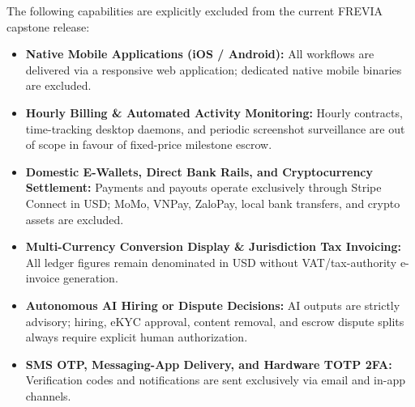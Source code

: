 The following capabilities are explicitly excluded from the current FREVIA capstone release:
\begin{itemize}[leftmargin=1.0cm, label=--]
\item \textbf{Native Mobile Applications (iOS / Android):} All workflows are delivered via a responsive web application; dedicated native mobile binaries are excluded.
\item \textbf{Hourly Billing \& Automated Activity Monitoring:} Hourly contracts, time-tracking desktop daemons, and periodic screenshot surveillance are out of scope in favour of fixed-price milestone escrow.
\item \textbf{Domestic E-Wallets, Direct Bank Rails, and Cryptocurrency Settlement:} Payments and payouts operate exclusively through Stripe Connect in USD; MoMo, VNPay, ZaloPay, local bank transfers, and crypto assets are excluded.
\item \textbf{Multi-Currency Conversion Display \& Jurisdiction Tax Invoicing:} All ledger figures remain denominated in USD without VAT/tax-authority e-invoice generation.
\item \textbf{Autonomous AI Hiring or Dispute Decisions:} AI outputs are strictly advisory; hiring, eKYC approval, content removal, and escrow dispute splits always require explicit human authorization.
\item \textbf{SMS OTP, Messaging-App Delivery, and Hardware TOTP 2FA:} Verification codes and notifications are sent exclusively via email and in-app channels.
\end{itemize}
